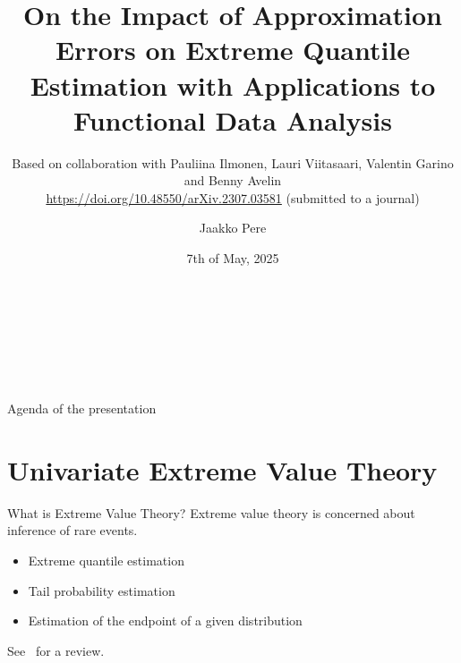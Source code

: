 \documentclass[11pt, aspectratio=169]{beamer}
\author[Jaakko Pere]{Jaakko Pere}
\title{On the Impact of Approximation Errors on Extreme Quantile Estimation with
Applications to Functional Data Analysis}
\subtitle{Based on collaboration with Pauliina Ilmonen, Lauri Viitasaari,
Valentin Garino and Benny Avelin \\
\textcolor{hyscience}{\url{https://doi.org/10.48550/arXiv.2307.03581}}
(submitted to a journal)}
\date{7th of May, 2025}
\institute{Dep.\ of Mathematics and Statistics, University of Helsinki}
\begin{document}
{
  \begin{frame}
    \vspace{2.5cm}
    \begin{center}
      \textcolor{hyblue}{\bf\MakeUppercase{\Large\inserttitle}} \\
      {\footnotesize\insertsubtitle} \\
      {\large\insertauthor} \\
      {\large\insertdate} \\
      {\large\insertinstitute}
    \end{center}
  \end{frame}
}

\begin{frame}{Agenda of the presentation}
  \tableofcontents
\end{frame}

\section{Univariate Extreme Value Theory}


\begin{frame}{What is Extreme Value Theory?}
  Extreme value theory is concerned about inference of rare events.
  \pause
  \vspace{\baselineskip}
  \begin{itemize}
    \item Extreme quantile estimation
    \item Tail probability estimation
    \item Estimation of the endpoint of a given distribution
  \end{itemize}
  \pause
  See~\cite{dehaan2006} for a review.
\end{frame}

\end{document}
